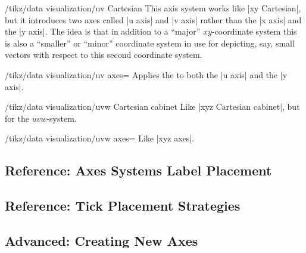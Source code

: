 \begin{key}{/tikz/data visualization/uv Cartesian}
  This axis system works like |xy Cartesian|, but it introduces two
  axes called |u axis| and |v axis| rather than the |x axis| and the
  |y axis|. The idea is that in addition to a ``major''
  $xy$-coordinate system this is also a ``smaller'' or ``minor''
  coordinate system in use for depicting, say, small vectors with
  respect to this second coordinate system.
  
  \begin{key}{/tikz/data visualization/uv axes=}
    Applies the  to both the |u axis| and the |y axis|.
  \end{key}

\end{key}

\begin{key}{/tikz/data visualization/uvw Cartesian cabinet}
  Like |xyz Cartesian cabinet|, but for the $uvw$-system.
  
  \begin{key}{/tikz/data visualization/uvw axes=}
    Like |xyz axes|.
  \end{key}
\end{key}



\subsection{Reference: Axes Systems Label Placement}

\subsection{Reference: Tick Placement Strategies}

\subsection{Advanced: Creating New Axes}
